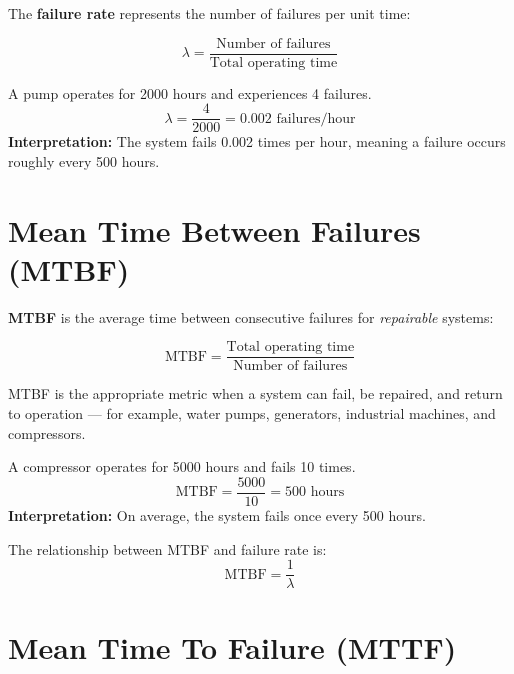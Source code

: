 \documentclass[12pt,a4paper]{article}
\begin{document}
The \textbf{failure rate} represents the number of failures per unit time:

\begin{equation}
\lambda = \frac{\text{Number of failures}}{\text{Total operating time}}
\end{equation}

\begin{example}
A pump operates for 2000 hours and experiences 4 failures.
\[
\lambda = \frac{4}{2000} = 0.002 \text{ failures/hour}
\]
\textbf{Interpretation:} The system fails 0.002 times per hour, meaning a failure occurs roughly every 500 hours.
\end{example}

\section{Mean Time Between Failures (MTBF)}

\textbf{MTBF} is the average time between consecutive failures for \emph{repairable} systems:

\begin{equation}
\text{MTBF} = \frac{\text{Total operating time}}{\text{Number of failures}}
\end{equation}

MTBF is the appropriate metric when a system can fail, be repaired, and return to operation --- for example, water pumps, generators, industrial machines, and compressors.

\begin{example}
A compressor operates for 5000 hours and fails 10 times.
\[
\text{MTBF} = \frac{5000}{10} = 500 \text{ hours}
\]
\textbf{Interpretation:} On average, the system fails once every 500 hours.
\end{example}

The relationship between MTBF and failure rate is:
\begin{equation}
\text{MTBF} = \frac{1}{\lambda}
\end{equation}

\section{Mean Time To Failure (MTTF)}
\end{document}
